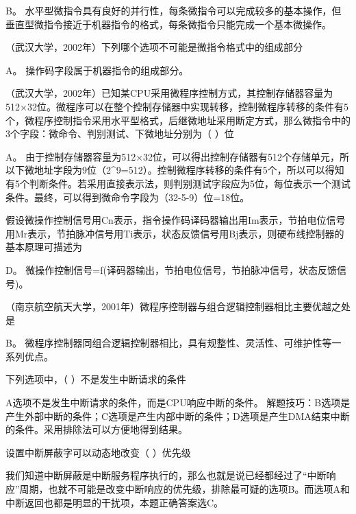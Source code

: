 \begin{solution}B。
水平型微指令具有良好的并行性，每条微指令可以完成较多的基本操作，但垂直型微指令接近于机器指令的格式，每条微指令只能完成一个基本微操作。
\end{solution}
\question （武汉大学，2002年）下列哪个选项不可能是微指令格式中的组成部分
\par{}
\begin{solution}A。 操作码字段属于机器指令的组成部分。
\end{solution}
\question （武汉大学，2002年）已知某CPU采用微程序控制方式，其控制存储器容量为512×32位。微程序可以在整个控制存储器中实现转移，控制微程序转移的条件有5个，微程序控制指令采用水平型格式，后继微地址采用断定方式，那么微指令中的3个字段：微命令、判别测试、下微地址分别为（
）位
\par{}
\begin{solution}A。
由于控制存储器容量为512×32位，可以得出控制存储器有512个存储单元，所以下微地址字段为9位（2\^{}9=512）。控制微程序转移的条件有5个，所以可以得知有5个判断条件。若采用直接表示法，则判别测试字段应为5位，每位表示一个测试条件。最终，可以得到微命令字段为（32-5-9）位=18位。
\end{solution}
\question 假设微操作控制信号用Cn表示，指令操作码译码器输出用Im表示，节拍电位信号用Mr表示，节拍脉冲信号用Ti表示，状态反馈信号用Bj表示，则硬布线控制器的基本原理可描述为
\par{}
\begin{solution}D。
微操作控制信号=f(译码器输出，节拍电位信号，节拍脉冲信号，状态反馈信号)。
\end{solution}
\question （南京航空航天大学，2001年）微程序控制器与组合逻辑控制器相比主要优越之处是
\par{}
\begin{solution}B。
微程序控制器同组合逻辑控制器相比，具有规整性、灵活性、可维护性等一系列优点。
\end{solution}
\question 下列选项中，（ ）不是发生中断请求的条件
\par{}
\begin{solution}A选项不是发生中断请求的条件，而是CPU响应中断的条件。
解题技巧：B选项是产生外部中断的条件；C选项是产生内部中断的条件；D选项是产生DMA结束中断的条件。采用排除法可以方便地得到结果。
\end{solution}
\question 设置中断屏蔽字可以动态地改变（ ）优先级
\par{}
\begin{solution}我们知道中断屏蔽是中断服务程序执行的，那么也就是说已经都经过了``中断响应''周期，也就不可能是改变中断响应的优先级，排除最可疑的选项B。而选项A和中断返回也都是明显的干扰项，本题正确答案选C。
\end{solution}
